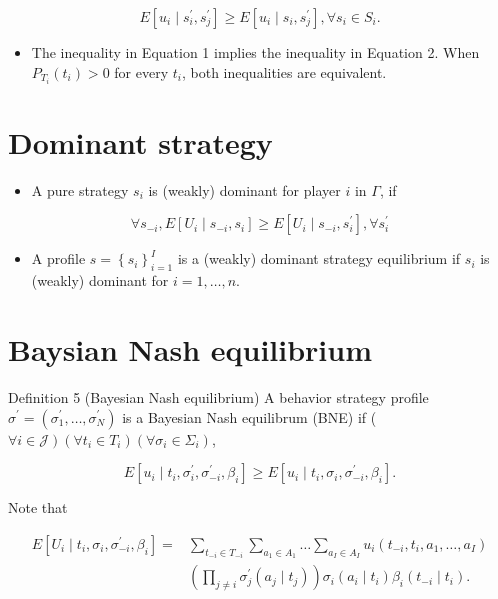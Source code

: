 \documentclass[10pt]{article}
\begin{document}
\begin{equation*}
E\left[u_{i} \mid s_{i}^{\prime}, s_{j}^{\prime}\right] \geq E\left[u_{i} \mid s_{i}, s_{j}^{\prime}\right], \forall s_{i} \in S_{i} . \tag{2}
\end{equation*}


\begin{itemize}
  \item The inequality in Equation 1 implies the inequality in Equation 2. When $P_{T_{i}}\left(t_{i}\right)>0$ for every $t_{i}$, both inequalities are equivalent.
\end{itemize}

\section*{Dominant strategy}
\begin{itemize}
  \item A pure strategy $s_{i}$ is (weakly) dominant for player $i$ in $\Gamma$, if
\end{itemize}

$$
\forall s_{-i}, E\left[U_{i} \mid s_{-i}, s_{i}\right] \geq E\left[U_{i} \mid s_{-i}, s_{i}^{\prime}\right], \forall s_{i}^{\prime}
$$

\begin{itemize}
  \item A profile $s=\left\{s_{i}\right\}_{i=1}^{I}$ is a (weakly) dominant strategy equilibrium if $s_{i}$ is (weakly) dominant for $i=1, \ldots, n$.
\end{itemize}

\section*{Baysian Nash equilibrium}
Definition 5 (Bayesian Nash equilibrium) A behavior strategy profile $\sigma^{\prime} =\left(\sigma_{1}^{\prime}, \ldots, \sigma_{N}^{\prime}\right)$ is a Bayesian Nash equilibrum (BNE) if ( $\left.\forall i \in \mathcal{J}\right)\left(\forall t_{i}\right. \left.\in T_{i}\right)\left(\forall \sigma_{i} \in \Sigma_{i}\right)$,

$$
E\left[u_{i} \mid t_{i}, \sigma_{i}^{\prime}, \sigma_{-i}^{\prime}, \beta_{i}\right] \geq E\left[u_{i} \mid t_{i}, \sigma_{i}, \sigma_{-i}^{\prime}, \beta_{i}\right] .
$$

Note that

$$
\begin{aligned}
E\left[U_{i} \mid t_{i}, \sigma_{i}, \sigma_{-i}^{\prime}, \beta_{i}\right]= & \sum_{t_{-i} \in T_{-i}} \sum_{a_{1} \in A_{1}} \ldots \sum_{a_{I} \in A_{I}} u_{i}\left(t_{-i}, t_{i}, a_{1}, \ldots, a_{I}\right) \\
& \left(\prod_{j \neq i} \sigma_{j}^{\prime}\left(a_{j} \mid t_{j}\right)\right) \sigma_{i}\left(a_{i} \mid t_{i}\right) \beta_{i}\left(t_{-i} \mid t_{i}\right) .
\end{aligned}
$$
\end{document}
